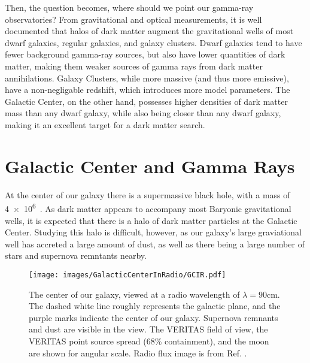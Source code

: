   Then, the question becomes, where should we point our gamma-ray observatories?
  From gravitational and optical measurements, it is well documented that halos of dark matter augment the gravitational wells of most dwarf galaxies, regular galaxies, and galaxy clusters.
  Dwarf galaxies tend to have fewer background gamma-ray sources, but also have lower quantities of dark matter, making them weaker sources of gamma rays from dark matter annihilations.
  Galaxy Clusters, while more massive (and thus more emissive), have a non-negligable redshift, which introduces more model parameters.
  The Galactic Center, on the other hand, possesses higher densities of dark matter mass than any dwarf galaxy, while also being closer than any dwarf galaxy, making it an excellent target for a dark matter search.


\section{Galactic Center and Gamma Rays}

  At the center of our galaxy there is a supermassive black hole, with a mass of \SI{4e6}{\Msol{}}~\cite{sgra_massdist}.
  As dark matter appears to accompany most Baryonic gravitational wells, it is expected that there is a halo of dark matter particles at the Galactic Center.
  Studying this halo is difficult, however, as our galaxy's large graviational well has accreted a large amount of dust, as well as there being a large number of stars and supernova remntants nearby.

  \begin{figure}[!t]
    \centering
    \texttt{[image: images/GalacticCenterInRadio/GCIR.pdf]}
    \caption[Galactic Center in Radio]{
      The center of our galaxy, viewed at a radio wavelength of $\lambda=90\text{cm}$.
      The dashed white line roughly represents the galactic plane, and the purple marks indicate the center of our galaxy.
      Supernova remnants and dust are visible in the view.
      The VERITAS field of view, the VERITAS point source spread (68\% containment), and the moon are shown for angular scale.
      Radio flux image is from Ref. \cite{galactic_center_in_radio}.
      \CaptionBlankLine
    }
    \label{fig_gc_radio}
  \end{figure}

